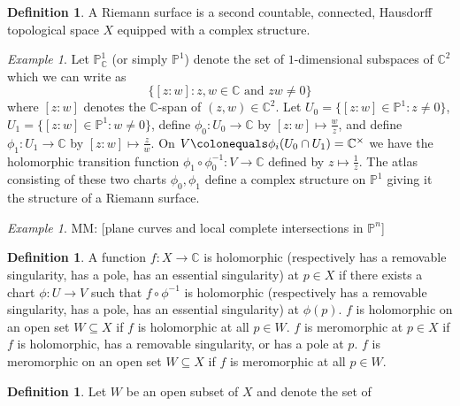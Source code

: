 \documentclass{dcthesis}
\newcommand{\PP}{\mathbb P}
\newcommand{\CC}{\mathbb C}
\newcommand{\defi}[1]{\textsf{#1}}
\newcommand{\mm}[1]{{\color{blue} \sf MM: [#1]}}
\theoremstyle{definition}
\newtheorem{definition}[prop]{Definition}
\theoremstyle{remark}
\newtheorem{example}[prop]{Example}
\numberwithin{equation}{section}
\numberwithin{figure}{section}
\begin{document}
{{    \begin{definition}
      \label{def:riemannsurface}
      A \defi{Riemann surface}
      is a second countable, connected,
      Hausdorff topological space $X$
      equipped with a complex structure.
    \end{definition}
    \begin{example}
      \label{exm:PP1}
      Let $\PP^1_\CC$ (or simply $\PP^1$)
      denote the set of $1$-dimensional subspaces of $\CC^2$
      which we can write as
      \[
        \{[z:w] : z,w\in\CC\text{ and }zw\ne 0\}
      \]
      where $[z:w]$ denotes the $\CC$-span of $(z,w)\in\CC^2$.
      Let $U_0 = \{[z:w]\in\PP^1 : z\neq 0\}$,
      $U_1 = \{[z:w]\in\PP^1 : w\neq 0\}$,
      define $\phi_0\colon U_0\to\CC$
      by $[z:w]\mapsto \frac{w}{z}$,
      and
      define $\phi_1\colon U_1\to\CC$
      by $[z:w]\mapsto \frac{z}{w}$.
      On $V\colonequals \phi_i(U_0\cap U_1) = \CC^\times$
      we have the holomorphic transition function
      $\phi_1\circ\phi_0^{-1}\colon V\to\CC$
      defined by $z\mapsto \frac{1}{z}$.
      The atlas consisting of these two charts $\phi_0,\phi_1$
      define a complex structure on $\PP^1$
      giving it the structure of a Riemann surface.
    \end{example}
    \begin{example}
      \label{exm:planecurves}
      \mm{plane curves and local complete intersections in $\PP^n$}
    \end{example}
    \begin{definition}
      \label{def:singularities}
      A function $f\colon X\to\CC$ is
      \defi{holomorphic
        (respectively has a removable singularity,
        has a pole, has an essential singularity)
      }
      at $p\in X$ if there exists a chart
      $\phi\colon U\to V$ such that
      $f\circ\phi^{-1}$ is
      holomorphic (respectively has a removable singularity, has a pole,
      has an essential singularity)
      at $\phi(p)$.
      $f$ is \defi{holomorphic on an open set $W\subseteq X$} if
      $f$ is holomorphic at all $p\in W$.
      $f$ is \defi{meromorphic} at $p\in X$
      if $f$ is holomorphic, has a removable singularity,
      or has a pole at $p$.
      $f$ is \defi{meromorphic on an open set $W\subseteq X$}
      if
      $f$ is meromorphic at all $p\in W$.
    \end{definition}
    \begin{definition}
      \label{def:laurentseries}
      Let $W$ be an open subset of $X$ and denote the set of

\end{definition}}}
\end{document}
